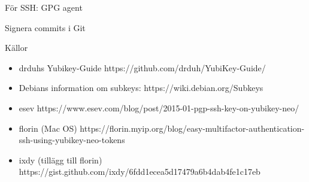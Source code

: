 \documentclass{beamer}
\begin{document}
\begin{frame}[fragile]{För SSH: GPG agent}
\end{frame}

\begin{frame}[fragile]{Signera commits i Git}
\end{frame}

\begin{frame}{Källor}
  \begin{itemize}
    \item drduhs Yubikey-Guide https://github.com/drduh/YubiKey-Guide/
    \item Debians information om subkeys: https://wiki.debian.org/Subkeys
    \item esev https://www.esev.com/blog/post/2015-01-pgp-ssh-key-on-yubikey-neo/
    \item florin (Mac OS) https://florin.myip.org/blog/easy-multifactor-authentication-ssh-using-yubikey-neo-tokens
    \item ixdy (tillägg till florin) https://gist.github.com/ixdy/6fdd1ecea5d17479a6b4dab4fe1c17eb
  \end{itemize}
\end{frame}



\end{document}
